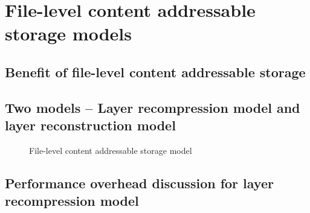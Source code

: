 \section{File-level content addressable storage models}
\label{sec:file_adressable}


\subsection{Benefit of file-level content addressable storage}


\subsection{Two models -- Layer recompression model and layer reconstruction model}

\begin{figure}
	\centering
	\caption{File-level content addressable storage model}
	\label{fig:eval-stdev-erasure-cnt}
\end{figure}

\subsection{Performance overhead discussion for layer recompression model}


